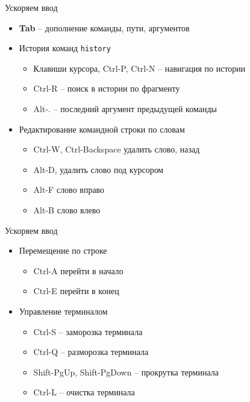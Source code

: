 \begin{frame}{Ускоряем ввод}
  \begin{itemize}
    \item \textbf{Tab} -- дополнение команды, пути, аргументов
      \pause
    \item История команд \alert{{\tt history}}
      \begin{itemize}
        \item Клавиши курсора, \alert{Ctrl-P}, Ctrl-N -- навигация по истории
        \item \alert{Ctrl-R} -- поиск в истории по фрагменту
        \item \alert{Alt-.}  -- последний аргумент предыдущей команды
      \end{itemize}
      \pause
    \item Редактирование командной строки по словам
      \begin{itemize}
        \item \alert{Ctrl-W}, Ctrl-Backspace удалить слово, назад
        \item \alert{Alt-D}, удалить слово под курсором 
        \item \alert{Alt-F} слово вправо
        \item \alert{Alt-B} слово влево
      \end{itemize}
      \pause
  \end{itemize}
\end{frame}

\begin{frame}{Ускоряем ввод}
  \begin{itemize}
    \item Перемещение по строке
      \begin{itemize}
        \item \alert{Ctrl-A} перейти в начало 
        \item \alert{Ctrl-E} перейти в конец
      \end{itemize}
      \pause
    \item Управление терминалом
      \begin{itemize}
        \item Ctrl-S -- заморозка терминала
        \item Ctrl-Q -- разморозка терминала
        \item \alert{Shift-PgUp}, \alert{Shift-PgDown} -- прокрутка терминала
        \item \alert{Ctrl-L} -- очистка терминала
      \end{itemize}
  \end{itemize}
\end{frame}


